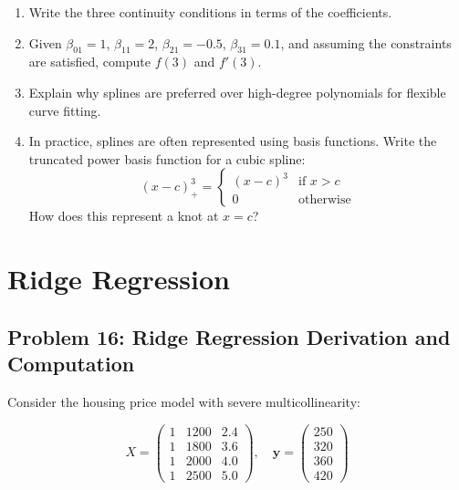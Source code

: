 \documentclass[12pt]{article}
\begin{document}
\begin{enumerate}[label=(\alph*)]
\item Write the three continuity conditions in terms of the coefficients.

\item Given \(\beta_{01} = 1\), \(\beta_{11} = 2\), \(\beta_{21} = -0.5\), \(\beta_{31} = 0.1\), and assuming the constraints are satisfied, compute \(f(3)\) and \(f'(3)\).

\item Explain why splines are preferred over high-degree polynomials for flexible curve fitting.

\item In practice, splines are often represented using basis functions. Write the truncated power basis function for a cubic spline:
\[
(x - c)_+^3 = \begin{cases} (x-c)^3 & \text{if } x > c \\ 0 & \text{otherwise} \end{cases}
\]
How does this represent a knot at \(x = c\)?
\end{enumerate}


\section{Ridge Regression}

\subsection*{Problem 16: Ridge Regression Derivation and Computation}

Consider the housing price model with severe multicollinearity:

\[
X = \begin{pmatrix}
1 & 1200 & 2.4 \\
1 & 1800 & 3.6 \\
1 & 2000 & 4.0 \\
1 & 2500 & 5.0
\end{pmatrix}, \quad
\mathbf{y} = \begin{pmatrix} 250 \\ 320 \\ 360 \\ 420 \end{pmatrix}
\]
\end{document}
